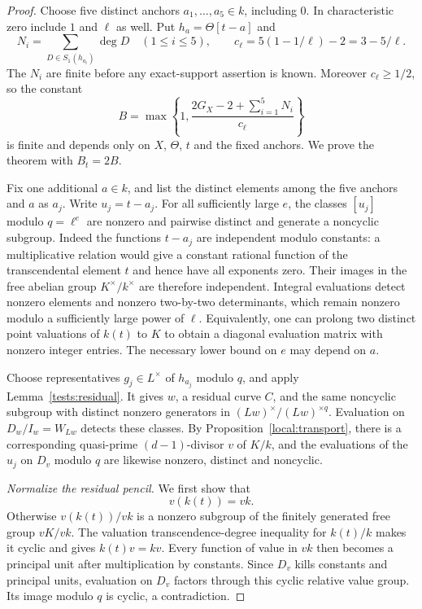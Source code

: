\begin{proof}
Choose five distinct anchors $a_1,\ldots,a_5\in k$, including $0$.
In characteristic zero include $1$ and $\ell$ as well.
Put $h_a=\Theta[t-a]$ and
\[
 N_i=\sum_{D\in S_1(h_{a_i})}\deg D\quad(1\le i\le5),
 \qquad c_\ell=5(1-1/\ell)-2=3-5/\ell.
\]
The $N_i$ are finite before any exact-support assertion is known.
Moreover $c_\ell\ge1/2$, so the constant
\begin{equation}\label{pencil:constant}
 B=\max\left\{1,\frac{2G_X-2+\sum_{i=1}^5N_i}{c_\ell}\right\}
\end{equation}
is finite and depends only on $X$, $\Theta$, $t$ and the fixed anchors.
We prove the theorem with $B_t=2B$.

Fix one additional $a\in k$, and list the distinct elements among the
five anchors and $a$ as $a_j$.  Write $u_j=t-a_j$.
For all sufficiently large $e$, the classes $[u_j]$ modulo $q=\ell^e$
are nonzero and pairwise distinct and generate a noncyclic subgroup.
Indeed the functions $t-a_j$ are independent modulo constants: a
multiplicative relation would give a constant rational function of the
transcendental element $t$ and hence have all exponents zero.
Their images in the free abelian group $K^\times/k^\times$ are
therefore independent.  Integral evaluations detect nonzero elements
and nonzero two-by-two determinants, which remain nonzero modulo a
sufficiently large power of $\ell$.
Equivalently, one can prolong two distinct point valuations of $k(t)$
to $K$ to obtain a diagonal evaluation matrix with nonzero integer
entries.  The necessary lower bound on $e$ may depend on $a$.

Choose representatives $g_j\in L^\times$ of $h_{a_j}$ modulo $q$,
and apply Lemma~\ref{tests:residual}.
It gives $w$, a residual curve $C$, and the same noncyclic subgroup with
distinct nonzero generators in $(Lw)^\times/(Lw)^{\times q}$.
Evaluation on $D_w/I_w=W_{Lw}$ detects these classes.
By Proposition~\ref{local:transport}, there is a corresponding quasi-prime
$(d-1)$-divisor $v$ of $K/k$, and the evaluations of the $u_j$ on $D_v$
modulo $q$ are likewise nonzero, distinct and noncyclic.

\emph{Normalize the residual pencil.}
We first show that
\begin{equation}\label{pencil:no-relative-value}
 v(k(t))=vk.
\end{equation}
Otherwise $v(k(t))/vk$ is a nonzero subgroup of the finitely generated
free group $vK/vk$.  The valuation transcendence-degree inequality for
$k(t)/k$ makes it cyclic and gives $k(t)v=kv$.
Every function of value in $vk$ then becomes a principal unit after
multiplication by constants.  Since $D_v$ kills constants and principal
units, evaluation on $D_v$ factors through this cyclic relative value
group.  Its image modulo $q$ is cyclic, a contradiction.


\end{proof}
